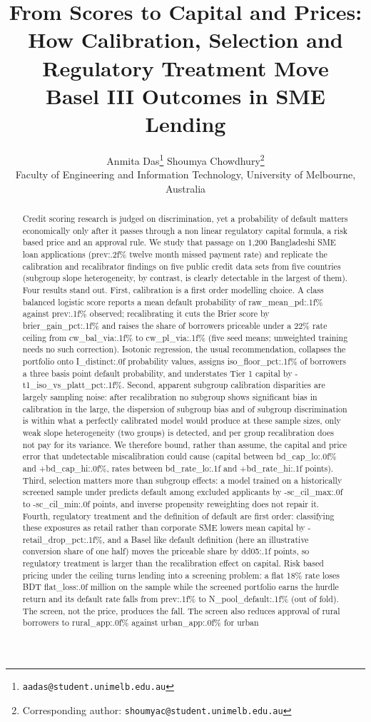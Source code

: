 \documentclass[11pt,a4paper]{article}
\title{\bfseries From Scores to Capital and Prices:\\
How Calibration, Selection and Regulatory Treatment Move\\
Basel III Outcomes in SME Lending}
\author{Anmita Das\thanks{\texttt{aadas@student.unimelb.edu.au}}
\quad Shoumya Chowdhury\thanks{Corresponding author: \texttt{shoumyac@student.unimelb.edu.au}}\\[2pt]
\small Faculty of Engineering and Information Technology, University of Melbourne, Australia}
\date{}
\begin{document}
\maketitle

\begin{abstract}
\noindent
Credit scoring research is judged on discrimination, yet a probability of default matters economically only after it passes through a non linear regulatory capital formula, a risk based price and an approval rule. We study that passage on 1{,}200 Bangladeshi SME loan applications ({{prev:.2f}}\% twelve month missed payment rate) and replicate the calibration and recalibrator findings on five public credit data sets from five countries (subgroup slope heterogeneity, by contrast, is clearly detectable in the largest of them). Four results stand out. First, calibration is a first order modelling choice. A class balanced logistic score reports a mean default probability of {{raw_mean_pd:.1f}}\% against {{prev:.1f}}\% observed; recalibrating it cuts the Brier score by {{brier_gain_pct:.1f}}\% and raises the share of borrowers priceable under a 22\% rate ceiling from {{cw_bal_via:.1f}}\% to {{cw_pl_via:.1f}}\% (five seed means; unweighted training needs no such correction). Isotonic regression, the usual recommendation, collapses the portfolio onto {{I_distinct:.0f}} probability values, assigns {{iso_floor_pct:.1f}}\% of borrowers a three basis point default probability, and understates Tier 1 capital by {{-t1_iso_vs_platt_pct:.1f}}\%. Second, apparent subgroup calibration disparities are largely sampling noise: after recalibration no subgroup shows significant bias in calibration in the large, the dispersion of subgroup bias and of subgroup discrimination is within what a perfectly calibrated model would produce at these sample sizes, only weak slope heterogeneity (two groups) is detected, and per group recalibration does not pay for its variance. We therefore bound, rather than assume, the capital and price error that undetectable miscalibration could cause (capital between {{bd_cap_lo:.0f}}\% and +{{bd_cap_hi:.0f}}\%, rates between {{bd_rate_lo:.1f}} and +{{bd_rate_hi:.1f}} points). Third, selection matters more than subgroup effects: a model trained on a historically screened sample under predicts default among excluded applicants by {{-sc_cil_max:.0f}} to {{-sc_cil_min:.0f}} points, and inverse propensity reweighting does not repair it. Fourth, regulatory treatment and the definition of default are first order: classifying these exposures as retail rather than corporate SME lowers mean capital by {{-retail_drop_pct:.1f}}\%, and a Basel like default definition (here an illustrative conversion share of one half) moves the priceable share by {{dd05:.1f}} points, so regulatory treatment is larger than the recalibration effect on capital. Risk based pricing under the ceiling turns lending into a screening problem: a flat 18\% rate loses BDT {{flat_loss:.0f}} million on the sample while the screened portfolio earns the hurdle return and its default rate falls from {{prev:.1f}}\% to {{N_pool_default:.1f}}\% (out of fold). The screen, not the price, produces the fall. The screen also reduces approval of rural borrowers to {{rural_app:.0f}}\% against {{urban_app:.0f}}\% for urban 
\end{abstract}
\end{document}
